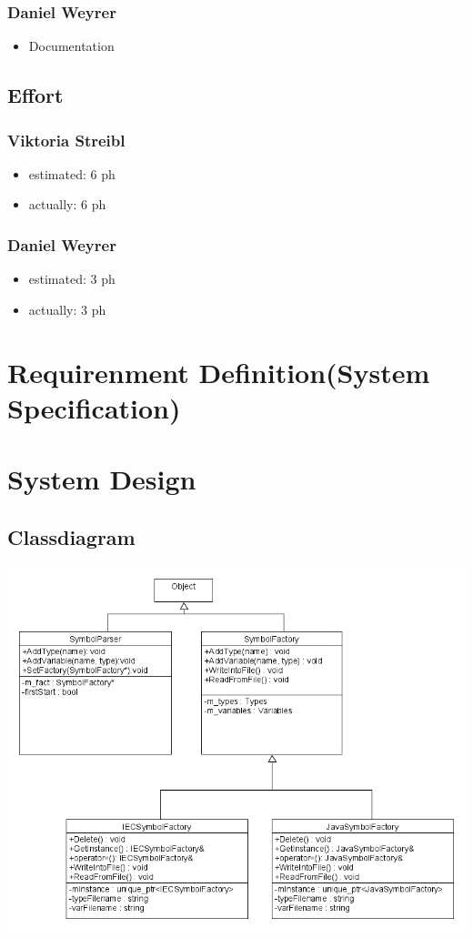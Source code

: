 \subsubsection{Daniel Weyrer}
\begin{itemize}
	\item Documentation
\end{itemize}

\subsection{Effort}

\subsubsection {Viktoria Streibl}
\begin{itemize}
	\item estimated: 6 ph 
	\item actually: 6 ph
\end{itemize}

\subsubsection {Daniel Weyrer}
\begin{itemize}
	\item estimated: 3 ph 
	\item actually: 3 ph
\end{itemize}

\section{Requirenment Definition(System Specification)}


\section{System Design}
\subsection{Classdiagram}
\includegraphics[scale=0.56, angle=90]{ClassDiagramm}

